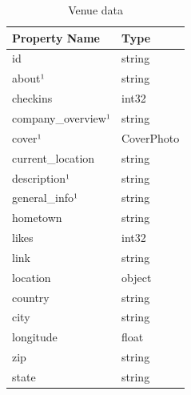 \begin{table}[h]
\begin{minipage}{.5\linewidth}
				\end{minipage}%
				\begin{minipage}{.5\linewidth}
					\centering
					\caption{Venue data}
					    \begin{tabular}{|l|l|}
					    \hline
					    Property Name                   & Type                                            \\ \hline
					    id                              & string                                          \\
					    about¹                          & string                                          \\
					    checkins                        & int32                                           \\
					    company\_overview¹              & string                                          \\
					    cover¹                          & CoverPhoto                                      \\
					    current\_location               & string                                          \\
					    description¹                    & string                                          \\
					    general\_info¹                  & string                                          \\
					    hometown                        & string                                          \\
					    likes                           & int32                                           \\
					    link                            & string                                          \\
					    location                        & object                                          \\
					    country                         & string                                          \\
					    city                            & string                                          \\
					    longitude                       & float                                           \\
					    zip                             & string                                          \\
					    state                           & string                                          \\

\end{tabular}
\end{minipage}
\end{table}
